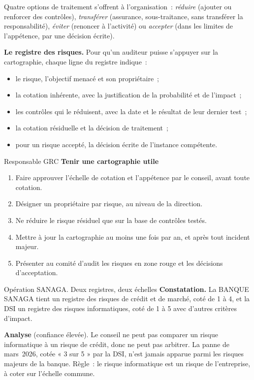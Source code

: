 Quatre options de traitement s'offrent à l'organisation~: \emph{réduire}
(ajouter ou renforcer des contrôles), \emph{transférer} (assurance,
sous-traitance, sans transférer la responsabilité), \emph{éviter} (renoncer
à l'activité) ou \emph{accepter} (dans les limites de l'appétence, par une
décision écrite).

\begin{boxprocedure}
\textbf{Le registre des risques.} Pour qu'un auditeur puisse s'appuyer sur la
cartographie, chaque ligne du registre indique~:
\begin{itemize}
    \item le risque, l'objectif menacé et son propriétaire~;
    \item la cotation inhérente, avec la justification de la probabilité et
          de l'impact~;
    \item les contrôles qui le réduisent, avec la date et le résultat de leur
          dernier test~;
    \item la cotation résiduelle et la décision de traitement~;
    \item pour un risque accepté, la décision écrite de l'instance
          compétente.
\end{itemize}
\end{boxprocedure}

\begin{boxmetier}{Responsable GRC}
\textbf{Tenir une cartographie utile}
\begin{enumerate}
    \item Faire approuver l'échelle de cotation et l'appétence par le
          conseil, avant toute cotation.
    \item Désigner un propriétaire par risque, au niveau de la direction.
    \item Ne réduire le risque résiduel que sur la base de contrôles testés.
    \item Mettre à jour la cartographie au moins une fois par an, et après
          tout incident majeur.
    \item Présenter au comité d'audit les risques en zone rouge et les
          décisions d'acceptation.
\end{enumerate}
\end{boxmetier}

\begin{boxscenario}{Opération SANAGA. Deux registres, deux échelles}
\textbf{Constatation.} La BANQUE SANAGA tient un registre des risques de
crédit et de marché, coté de 1 à 4, et la DSI un registre des risques
informatiques, coté de 1 à 5 avec d'autres critères d'impact.

\medskip
\textbf{Analyse} (confiance élevée). Le conseil ne peut pas comparer un
risque informatique à un risque de crédit, donc ne peut pas arbitrer. La
panne de mars~2026, cotée « 3 sur 5 » par la DSI, n'est jamais apparue
parmi les risques majeurs de la banque. Règle~: le risque informatique est
un risque de l'entreprise, à coter sur l'échelle commune.
\end{boxscenario}

